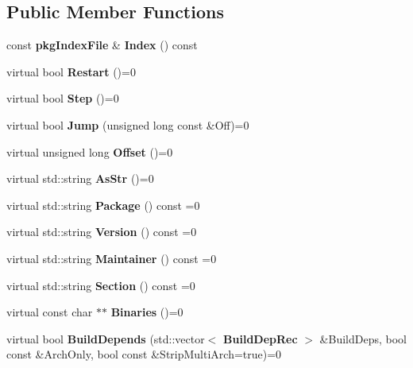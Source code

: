 \subsection*{\-Public \-Member \-Functions}
\begin{DoxyCompactItemize}
\item 
const {\bf pkg\-Index\-File} \& {\bfseries \-Index} () const \label{classpkgSrcRecords_1_1Parser_a54fb1d303b296020e8430b42368827fb}

\item 
virtual bool {\bfseries \-Restart} ()=0\label{classpkgSrcRecords_1_1Parser_a6719aadfe7d44f4d884bb25718eb12f3}

\item 
virtual bool {\bfseries \-Step} ()=0\label{classpkgSrcRecords_1_1Parser_a8924e033a9be582dfccaf68f84812f03}

\item 
virtual bool {\bfseries \-Jump} (unsigned long const \&\-Off)=0\label{classpkgSrcRecords_1_1Parser_abebb5b12c2408570ad7fc24b9270647e}

\item 
virtual unsigned long {\bfseries \-Offset} ()=0\label{classpkgSrcRecords_1_1Parser_afbff141d2144e3af657c2d86eff2574e}

\item 
virtual std\-::string {\bfseries \-As\-Str} ()=0\label{classpkgSrcRecords_1_1Parser_a885a78e90a77affc84ea81abe8e33e35}

\item 
virtual std\-::string {\bfseries \-Package} () const =0\label{classpkgSrcRecords_1_1Parser_ae76931826b3fef33990ac679f0898e16}

\item 
virtual std\-::string {\bfseries \-Version} () const =0\label{classpkgSrcRecords_1_1Parser_a33187e42cd3c7812d4c2c1983b26fb1d}

\item 
virtual std\-::string {\bfseries \-Maintainer} () const =0\label{classpkgSrcRecords_1_1Parser_a5865412e1d261fe82f9e60aa833592f2}

\item 
virtual std\-::string {\bfseries \-Section} () const =0\label{classpkgSrcRecords_1_1Parser_a8883f758628e817fc5d077ff85975856}

\item 
virtual const char $\ast$$\ast$ {\bfseries \-Binaries} ()=0\label{classpkgSrcRecords_1_1Parser_a9ef4052601029c57cab947a94bb796d5}

\item 
virtual bool {\bfseries \-Build\-Depends} (std\-::vector$<$ {\bf \-Build\-Dep\-Rec} $>$ \&\-Build\-Deps, bool const \&\-Arch\-Only, bool const \&\-Strip\-Multi\-Arch=true)=0\label{classpkgSrcRecords_1_1Parser_a3197f435b17e87aaab7fe2e798444c03}


\end{DoxyCompactItemize}

